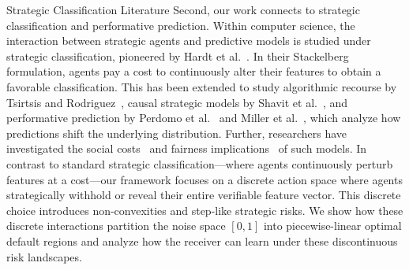 \begin{sourceblock}{Strategic Classification Literature}
Second, our work connects to strategic classification and performative prediction. Within computer science, the interaction between strategic agents and predictive models is studied under strategic classification, pioneered by Hardt et al.~\cite{hardt2016strategic}. In their Stackelberg formulation, agents pay a cost to continuously alter their features to obtain a favorable classification. This has been extended to study algorithmic recourse by Tsirtsis and Rodriguez~\cite{tsirtsis2020decisions}, causal strategic models by Shavit et al.~\cite{shavit2020causal}, and performative prediction by Perdomo et al.~\cite{perdomo2020performative} and Miller et al.~\cite{miller2020strategic}, which analyze how predictions shift the underlying distribution. Further, researchers have investigated the social costs~\cite{milli2019social} and fairness implications~\cite{hu2019disparate} of such models. In contrast to standard strategic classification—where agents continuously perturb features at a cost—our framework focuses on a discrete action space where agents strategically withhold or reveal their entire verifiable feature vector. This discrete choice introduces non-convexities and step-like strategic risks. We show how these discrete interactions partition the noise space $[0,1]$ into piecewise-linear optimal default regions and analyze how the receiver can learn under these discontinuous risk landscapes.
\end{sourceblock}

\begin{faqblock}
\faqanswers
{}
\end{faqblock}

